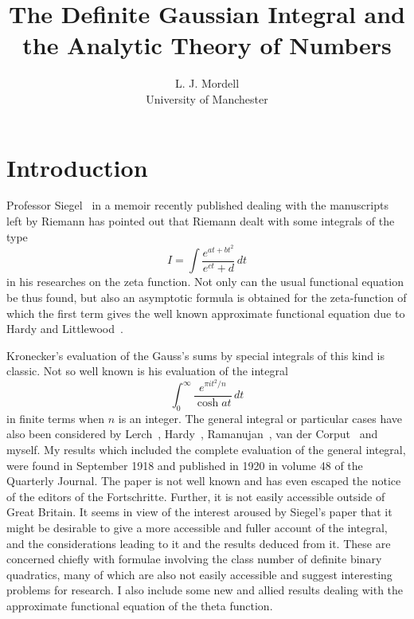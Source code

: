 \documentclass[12pt]{article}
\theoremstyle{remark}
\begin{document}
\title{The Definite Gaussian Integral and the Analytic Theory of Numbers}
\author{L. J. Mordell\\
University of Manchester}
\date{}
\maketitle

\section{Introduction}

Professor Siegel~\cite{Siegel1932} in a memoir recently published dealing with the manuscripts left by Riemann has pointed out that Riemann dealt with some integrals of the type
\begin{equation}\label{eq:riemann_integral}
I = \int \frac{e^{at + bt^2}}{e^{ct} + d} \, dt
\end{equation}
in his researches on the zeta function. Not only can the usual functional equation be thus found, but also an asymptotic formula is obtained for the zeta-function of which the first term gives the well known approximate functional equation due to Hardy and Littlewood~\cite{HardyLittlewood1914}.

Kronecker's evaluation of the Gauss's sums by special integrals of this kind is classic. Not so well known is his evaluation of the integral
\begin{equation}\label{eq:kronecker_integral}
\int_0^\infty \frac{e^{\pi i t^2/n}}{\cosh at} \, dt
\end{equation}
in finite terms when $n$ is an integer. The general integral or particular cases have also been considered by Lerch~\cite{Lerch1892}, Hardy~\cite{Hardy1904}, Ramanujan~\cite{Ramanujan1915a}, van der Corput~\cite{vanderCorput1922} and myself. My results which included the complete evaluation of the general integral, were found in September 1918 and published in 1920 in volume 48 of the Quarterly Journal. The paper is not well known and has even escaped the notice of the editors of the Fortschritte. Further, it is not easily accessible outside of Great Britain. It seems in view of the interest aroused by Siegel's paper that it might be desirable to give a more accessible and fuller account of the integral, and the considerations leading to it and the results deduced from it. These are concerned chiefly with formulae involving the class number of definite binary quadratics, many of which are also not easily accessible and suggest interesting problems for research. I also include some new and allied results dealing with the approximate functional equation of the theta function.
\end{document}
